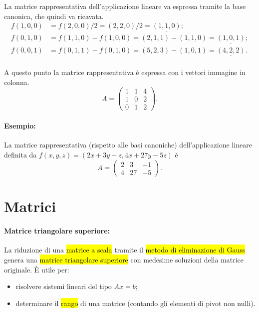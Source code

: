 \documentclass[a4paper]{article}
\begin{document}
        La matrice rappresentativa dell'applicazione lineare va espressa tramite la base canonica,
        che quindi va ricavata.
        \[
                \begin{aligned}
                        f(1,0,0) & = f(2,0,0) / 2 = (2,2,0) / 2 = \underline{(1,1,0)}; \\
                        f(0,1,0) & = f(1,1,0) - f(1,0,0) = (2,1,1) - (1,1,0) = \underline{(1,0,1)}; \\
                        f(0,0,1) & = f(0,1,1) - f(0,1,0) = (5,2,3) - (1,0,1) = \underline{(4,2,2)}. \\
                \end{aligned}
        \]

        A questo punto la matrice rappresentativa \`{e} espressa con i vettori immagine in colonna.
        \[
                A = \begin{pmatrix}
                        1 & 1 & 4 \\
                        1 & 0 & 2 \\
                        0 & 1 & 2
                \end{pmatrix}.
        \]

        \paragraph{Esempio:}
        La matrice rappresentativa (rispetto alle basi canoniche) dell'applicazione lineare definita da
        $
                f(x,y,z) = (2x + 3y - z, 4x + 27y - 5z)
        $
        \`{e}
        \[
                A = \begin{pmatrix}
                        2 & 3  & -1 \\
                        4 & 27 & -5
                \end{pmatrix}.
        \]


        \section*{Matrici}
        \paragraph{Matrice triangolare superiore:}
        La riduzione di una \hl{matrice a scala} tramite il \hl{metodo di eliminazione di Gauss} genera una \hl{matrice triangolare superiore} con medesime soluzioni della matrice originale. \`{E}  utile per:
        \begin{itemize}
                \item risolvere sistemi lineari del tipo $ Ax = b $;
                \item determinare il \hl{rango} di una matrice (contando gli elementi di pivot non nulli).
        \end{itemize}
\end{document}
